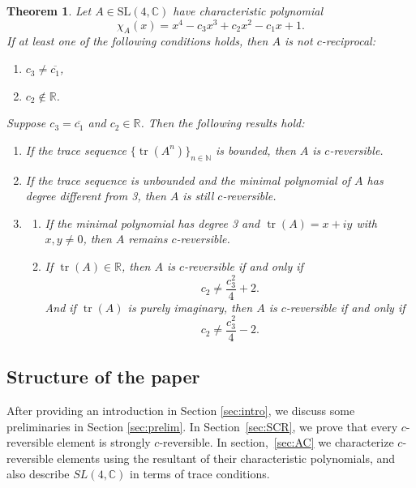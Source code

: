 \documentclass[11pt]{amsart}
\numberwithin{equation}{section}
\theoremstyle{plain}
\newtheorem{theorem}{Theorem}[section]
\theoremstyle{definition}
\numberwithin{equation}{section}
\begin{document}
\begin{theorem}\label{CT}
Let \( A \in \mathrm{SL}(4, \mathbb{C}) \) have characteristic polynomial
\[
\chi_A(x) = x^4 - c_3 x^3 + c_2 x^2 - c_1 x + 1.
\]
If at least one of the following conditions holds, then \( A \) is not \( c \)-reciprocal:
\begin{enumerate}
    \item[(i)] \( c_3 \ne \overline{c_1} \),
    \item[(ii)] \( c_2 \notin \mathbb{R} \).
\end{enumerate}

\medskip

Suppose \( c_3 = \overline{c_1} \) and \( c_2 \in \mathbb{R} \). Then the following results hold:
\begin{enumerate}
    \item If the trace sequence \( \{\operatorname{tr}(A^n)\}_{n \in \mathbb{N}} \) is bounded, then \( A \) is \( c \)-reversible.
    
    \item If the trace sequence is unbounded and the minimal polynomial of \( A \) has degree different from 3, then \( A \) is still \( c \)-reversible.
    
    \item
    \begin{enumerate} \item  If the minimal polynomial has degree 3 and \( \operatorname{tr}(A) = x + i y \) with \( x, y \ne 0 \), then \( A \) remains \( c \)-reversible.
    
    \item If \( \operatorname{tr}(A) \in \mathbb{R} \), then \( A \) is \( c \)-reversible if and only if
    \[
    c_2 \ne \frac{c_3^2}{4} + 2.
    \]
    And if \( \operatorname{tr}(A) \) is purely imaginary, then \( A \) is \( c \)-reversible if and only if
    \[
    c_2 \ne \frac{c_3^2}{4} - 2.
    \]
\end{enumerate}
\end{enumerate}
\end{theorem}

\subsection*{Structure of the paper}
After providing an introduction in Section \ref{sec:intro}, we discuss some preliminaries in Section \ref{sec:prelim}. In Section~\ref{sec:SCR}, we prove that every $c$-reversible element is strongly $c$-reversible. In section,~\ref{sec:AC} we characterize $c$-reversible elements using the resultant of their characteristic polynomials, and also describe $SL(4,\mathbb{C})$ in terms of trace conditions.
\end{document}
